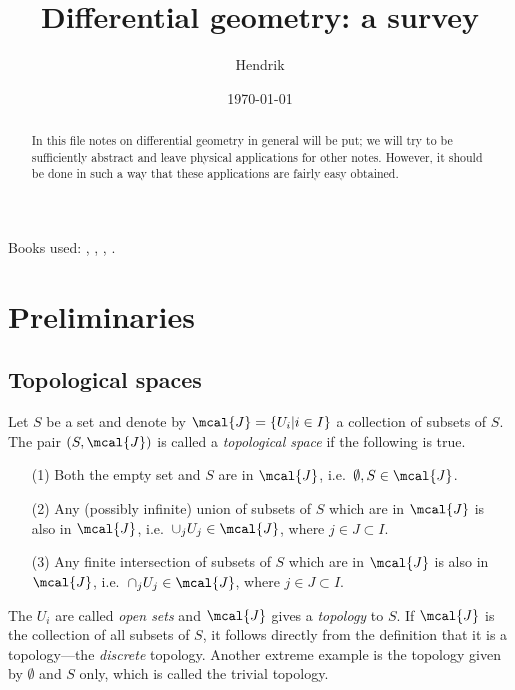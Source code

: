 \documentclass[10pt,reqno]{amsart}
\author{Hendrik}
\title{Differential geometry: a survey}
\date{\today}
\numberwithin{equation}{section}
\begin{document}
\begin{abstract}
In this file notes on differential geometry in general will be 
put; we will try to be sufficiently abstract and leave physical 
applications for other notes.  However, it should be done in such 
a way that these applications are fairly easy obtained.
\end{abstract}

\maketitle

\noindent Books used: \cite{nakahara2003geometry}, 
\cite{o1983semi}, \cite{kob1996found}, 
\cite{ruben1995introduction}.

\tableofcontents

\newpage

\section{Preliminaries}

\subsection{Topological spaces}

\begin{definition}
	Let $S$ be a set and denote by $\mcal{J} = \{U_i | i \in I\}$ a 
	collection of subsets of $S$. The pair $(S,\mcal{J})$ is called 
	a \emph{topological space} if the following is true.
	\begin{itemize}
		\item[(1)] Both the empty set and $S$ are in $\mcal{J}$, 
			i.e.\ $\emptyset, S \in \mcal{J}$.
		\item[(2)] Any (possibly infinite) union of subsets of $S$ 
			which are in $\mcal{J}$ is also in $\mcal{J}$, i.e.\ 
			$\cup_{j} U_j \in \mcal{J}$,
			where $j \in J \subset I$.
		\item[(3)] Any finite intersection of subsets of $S$ which 
			are in $\mcal{J}$ is also in $\mcal{J}$, i.e.\ $\cap_{j} 
			U_j \in \mcal{J}$, where $j \in J \subset I$.
	\end{itemize}
\end{definition}
%
The $U_i$ are called \emph{open sets} and $\mcal{J}$ gives a 
\emph{topology} to $S$. If $\mcal{J}$ is the collection of all 
subsets of $S$, it follows directly from the definition that it 
is a topology---the \emph{discrete} topology. Another extreme 
example is the topology given by $\emptyset$ and $S$ only, which 
is called the trivial topology.
%
\end{document}
